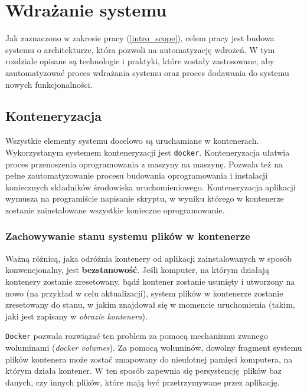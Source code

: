 \chapter{Wdrażanie systemu}

Jak zaznaczono w zakresie pracy (\ref{intro_scope}), celem pracy jest
budowa systemu o architekturze, która pozwoli na automatyzację wdrożeń.
W tym rozdziale opisane są technologie i praktyki, które zostały 
zastosowane, aby zautomatyzować proces wdrażania systemu oraz proces
dodawania do systemu nowych funkcjonalności.

\section{Konteneryzacja}

Wszystkie elementy systemu docelowo są uruchamiane w kontenerach.
Wykorzystanym systemem konteneryzacji jest \texttt{docker}\cite{docker}.
Konteneryzacja ułatwia proces przenoszenia oprogramowania 
z maszyny na maszynę. Pozwala też na pełne zautomatyzowanie
procesu budowania oprogramowania i instalacji koniecznych
składników środowiska uruchomieniowego. Konteneryzacja
aplikacji wymusza na programiście napisanie skryptu, w wyniku
którego w kontenerze zostanie zainstalowane wszystkie konieczne 
oprogramowanie.

\subsection{Zachowywanie stanu systemu plików w kontenerze}

Ważną różnicą, jaka odróżnia kontenery od aplikacji zainstalowanych
w sposób konwencjonalny, jest \textbf{bezstanowość}. Jeśli komputer,
na którym działają kontenery zostanie zresetowany, bądź kontener zostanie
usunięty i utworzony na nowo (na przykład w celu aktualizacji), system
plików w kontenerze zostanie zresetowany do stanu, w jakim znajdował się 
w momencie uruchomienia (takim, jaki jest zapisany w \textit{obrazie kontenera}).

\texttt{Docker} pozwala rozwiązać ten problem za pomocą mechanizmu zwanego 
woluminami (\textit{docker volumes})\cite{docker_volumes}.
Za pomocą woluminów, dowolny fragment systemu
plików kontenera może zostać zmapowany do nieulotnej pamięci komputera, na którym 
działa kontener. W ten sposób zapewnia się persystencję plików baz danych, czy innych
plików, które mają być przetrzymywane przez aplikację.\\ %

